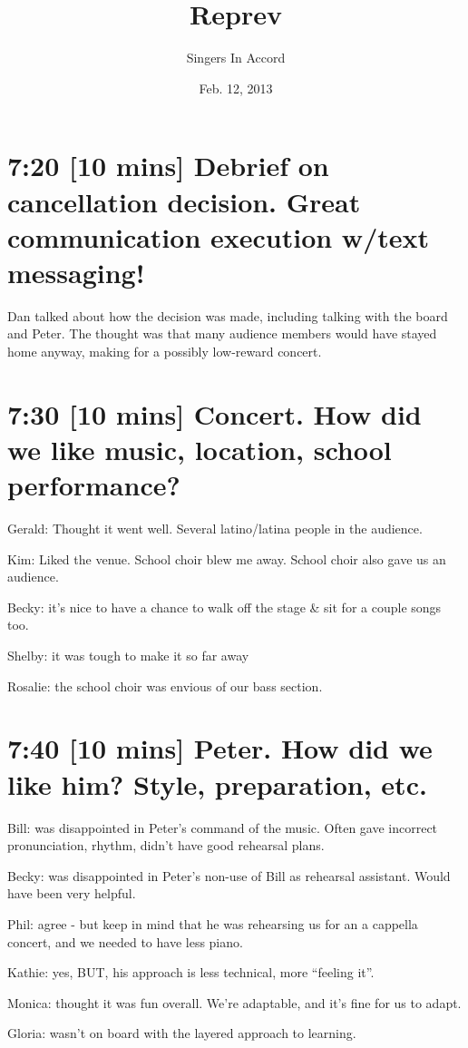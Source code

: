 \documentclass[11pt]{article}
\title{Reprev}
\author{Singers In Accord}
\date{Feb. 12, 2013}
\begin{document}
\maketitle


\section{7:20 [10 mins]  Debrief on cancellation decision.  Great communication execution w/text messaging!}
\label{sec-1}


Dan talked about how the decision was made, including talking with the
board and Peter.  The thought was that many audience members would
have stayed home anyway, making for a possibly low-reward concert.
\section{7:30 [10 mins] Concert.  How did we like music, location, school performance?}
\label{sec-2}


Gerald: Thought it went well.  Several latino/latina people in the
audience.

Kim: Liked the venue.  School choir blew me away.  School choir also
gave us an audience.

Becky: it's nice to have a chance to walk off the stage \& sit for a
couple songs too.

Shelby: it was tough to make it so far away

Rosalie: the school choir was envious of our bass section.
\section{7:40 [10 mins] Peter.  How did we like him?  Style, preparation, etc.}
\label{sec-3}


Bill: was disappointed in Peter's command of the music.  Often gave
incorrect pronunciation, rhythm, didn't have good rehearsal plans.

Becky: was disappointed in Peter's non-use of Bill as rehearsal
assistant.  Would have been very helpful.

Phil: agree - but keep in mind that he was rehearsing us for an a
cappella concert, and we needed to have less piano.

Kathie: yes, BUT, his approach is less technical, more ``feeling it''.

Monica: thought it was fun overall.  We're adaptable, and it's fine
for us to adapt.

Gloria: wasn't on board with the layered approach to learning.
\end{document}
